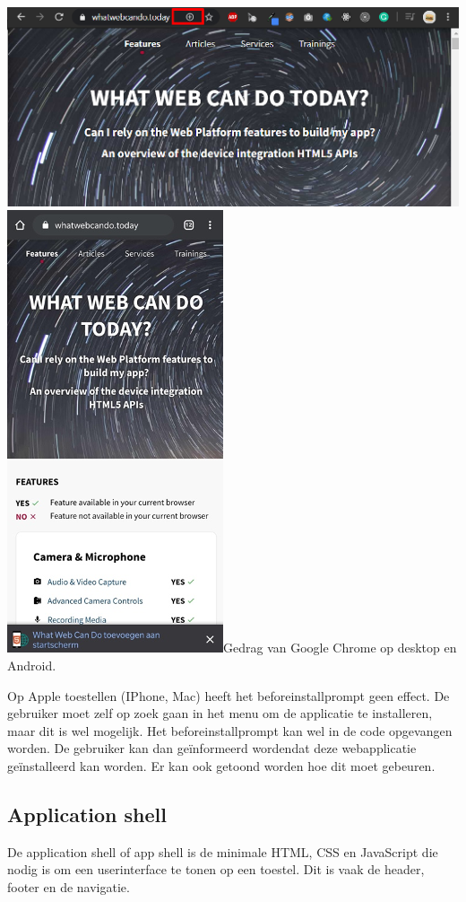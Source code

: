 \includegraphics{./img/beforeinstallprompt_windows.png}
\includegraphics{./img/beforeinstallprompt_android.png}{Gedrag van Google Chrome op desktop en Android.}


Op Apple toestellen (IPhone, Mac) heeft het beforeinstallprompt geen effect. De gebruiker moet zelf op zoek gaan in het menu om de applicatie te installeren, maar dit is wel mogelijk.
Het beforeinstallprompt kan wel in de code opgevangen worden. De  gebruiker kan dan geïnformeerd wordendat deze webapplicatie geïnstalleerd kan worden. Er kan ook getoond worden hoe dit moet gebeuren.

\autocite{PWAbuilder2020}


\subsection{Application shell}
De application shell of app shell is de minimale HTML, CSS en JavaScript die nodig is om een userinterface te tonen op een toestel. Dit is vaak de header, footer en de navigatie.


